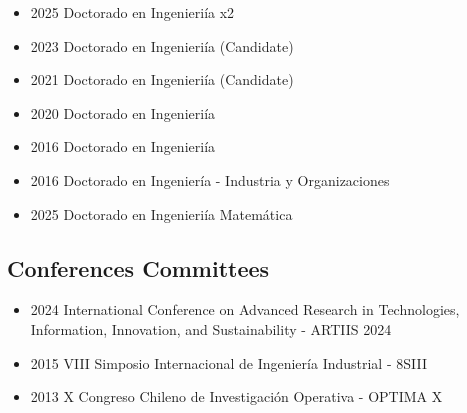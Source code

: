 {\begin{itemize}
    \item 2025 Doctorado en Ingenieri\'ia x2
    \item 2023 Doctorado en Ingenieri\'ia (Candidate)
    \item 2021 Doctorado en Ingenieri\'ia (Candidate)
    \item 2020 Doctorado en Ingenieri\'ia
\end{itemize}
}

{\begin{itemize}
    \item 2016 Doctorado en Ingenieri\'ia
\end{itemize}
}

{\begin{itemize}
    \item 2016 Doctorado en Ingenier\'ia - Industria y Organizaciones
\end{itemize}
}

{\begin{itemize}
    \item 2025 Doctorado en Ingenieri\'ia Matem\'atica
\end{itemize}
}

\clearpage

\subsection{Conferences Committees}

{\begin{itemize}
    \item 2024 International Conference on Advanced Research in Technologies, Information, Innovation, and Sustainability - ARTIIS 2024
    \item 2015 VIII Simposio Internacional de Ingenier\'ia Industrial - 8SIII
    \item 2013 X Congreso Chileno de Investigaci\'on Operativa - OPTIMA X
\end{itemize}
}

